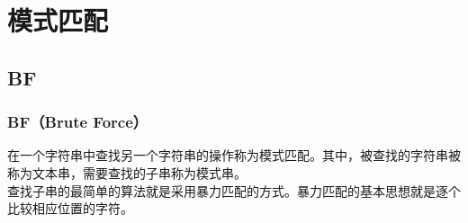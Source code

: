 \chapter{模式匹配}

\section{BF}

\subsection{BF（Brute Force）}

在一个字符串中查找另一个字符串的操作称为模式匹配。其中，被查找的字符串被称为文本串，需要查找的子串称为模式串。 \\

查找子串的最简单的算法就是采用暴力匹配的方式。暴力匹配的基本思想就是逐个比较相应位置的字符。 \\

